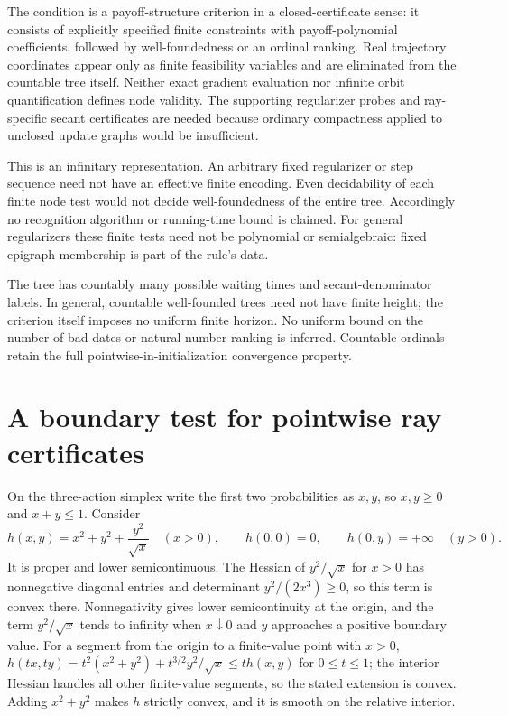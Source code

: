 \documentclass[11pt,a4paper]{article}
\begin{document}
The condition is a payoff-structure criterion in a closed-certificate sense:
it consists of explicitly specified finite constraints with payoff-polynomial
coefficients, followed by well-foundedness or an ordinal ranking. Real
trajectory coordinates appear only as finite feasibility variables and are
eliminated from the countable tree itself. Neither exact gradient evaluation
nor infinite orbit quantification defines node validity. The supporting
regularizer probes and ray-specific secant certificates are needed because
ordinary compactness applied to unclosed update graphs would be insufficient.

This is an infinitary representation. An arbitrary fixed regularizer or step
sequence need not have an effective finite encoding. Even decidability of
each finite node test would not decide well-foundedness of the entire tree.
Accordingly no recognition algorithm or running-time bound is claimed.
For general regularizers these finite tests need not be polynomial or
semialgebraic: fixed epigraph membership is part of the rule's data.

The tree has countably many possible waiting times and secant-denominator labels.
In general, countable well-founded trees need not have finite height; the
criterion itself imposes no uniform finite horizon. No uniform bound on the
number of bad dates or natural-number ranking is inferred. Countable ordinals
retain the full pointwise-in-initialization convergence property.

\section{A boundary test for pointwise ray certificates}

On the three-action simplex write the first two probabilities as \(x,y\),
so \(x,y\ge0\) and \(x+y\le1\). Consider
\begin{equation}
h(x,y)=x^2+y^2+\frac{y^2}{\sqrt x}\quad(x>0),\qquad
h(0,0)=0,\qquad h(0,y)=+\infty\quad(y>0).
\label{eq:b}
\end{equation}
It is proper and lower semicontinuous. The Hessian of \(y^2/\sqrt x\)
for \(x>0\) has nonnegative diagonal entries and determinant
\(y^2/(2x^3)\ge0\), so this term is convex there. Nonnegativity gives lower semicontinuity at the origin, and the term
\(y^2/\sqrt{x}\) tends to infinity when \(x\downarrow0\) and \(y\) approaches
a positive boundary value. For a segment from the origin to a finite-value
point with \(x>0\), \(h(tx,ty)=t^2(x^2+y^2)+t^{3/2}y^2/\sqrt{x}\le t h(x,y)\)
for \(0\le t\le1\); the interior Hessian handles all other finite-value
segments, so the stated extension is convex.
Adding \(x^2+y^2\) makes \(h\) strictly convex, and it is smooth on the
relative interior.
\end{document}
